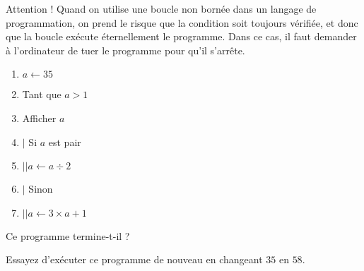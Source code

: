 \documentclass{article}
\begin{document}
\begin{remark}
Attention ! Quand on utilise une boucle non bornée dans un langage de programmation, on prend le risque que la condition soit toujours vérifiée, et donc que la boucle exécute éternellement le programme. Dans ce cas, il faut demander à l'ordinateur de \og tuer \fg le programme pour qu'il s'arrête.
\end{remark}

\begin{exercize}
\hfill
\begin{enumerate}
\item $a \leftarrow 35$
\item Tant que $a > 1$
\item Afficher $a$
\item $\vert$ Si $a$ est pair
\item $\vert \vert a \leftarrow a \div 2$
\item $\vert$ Sinon
\item $\vert \vert a \leftarrow 3 \times a + 1$  
\end{enumerate}

Ce programme termine-t-il ?

Essayez d'exécuter ce programme de nouveau en changeant $35$ en $58$.  
\end{exercize}
\end{document}
